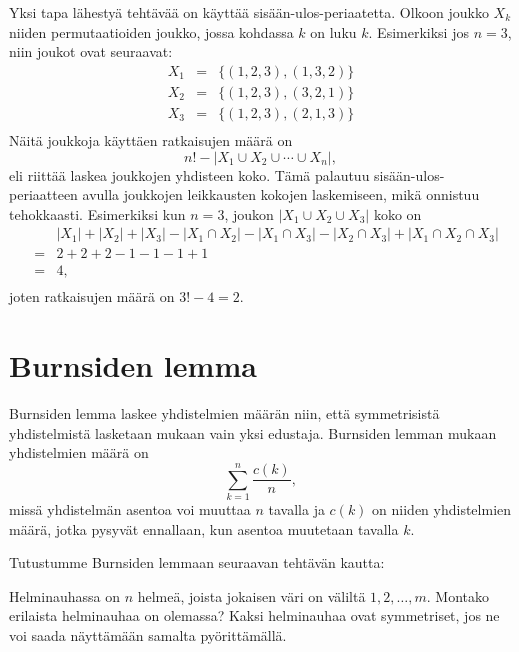 Yksi tapa lähestyä tehtävää on käyttää sisään-ulos-periaatetta.
Olkoon joukko $X_k$ niiden permutaatioiden joukko,
jossa kohdassa $k$ on luku $k$.
Esimerkiksi jos $n=3$, niin joukot ovat seuraavat:
\[
\begin{array}{lcl}
X_1 & = & \{(1,2,3),(1,3,2)\} \\
X_2 & = & \{(1,2,3),(3,2,1)\} \\
X_3 & = & \{(1,2,3),(2,1,3)\} \\
\end{array}
\]
Näitä joukkoja käyttäen ratkaisujen määrä on
\[ n! - |X_1 \cup X_2 \cup \cdots \cup X_n|, \]
eli
riittää laskea joukkojen yhdisteen koko.
Tämä palautuu sisään-ulos-peri\-aatteen avulla
joukkojen leikkausten kokojen laskemiseen,
mikä onnistuu tehokkaasti.
Esimerkiksi kun $n=3$, joukon $|X_1 \cup X_2 \cup X_3|$ koko on
\[
\begin{array}{lcl}
 & & |X_1| + |X_2| + |X_3| - |X_1 \cap X_2|  - |X_1 \cap X_3|  - |X_2 \cap X_3| + |X_1 \cap X_2 \cap X_3| \\
 & = & 2+2+2-1-1-1+1 \\
 & = & 4, \\
\end{array}
\]
joten ratkaisujen määrä on $3!-4=2$.

\section{Burnsiden lemma}

Burnsiden lemma laskee yhdistelmien määrän niin,
että symmetrisistä yhdistelmistä lasketaan
mukaan vain yksi edustaja.
Burnsiden lemman mukaan yhdistelmien määrä on
\[\sum_{k=1}^n \frac{c(k)}{n},\]
missä yhdistelmän asentoa voi muuttaa $n$ tavalla
ja $c(k)$ on niiden yhdistelmien määrä,
jotka pysyvät ennallaan, kun asentoa
muutetaan tavalla $k$.

\newpage
\noindent
Tutustumme Burnsiden lemmaan seuraavan tehtävän kautta:

\begin{task}
Helminauhassa on $n$ helmeä,
joista jokaisen väri on väliltä $1,2,\ldots,m$.
Montako erilaista helminauhaa on olemassa?
Kaksi helminauhaa ovat symmetriset,
jos ne voi saada näyttämään samalta pyörittämällä.
\end{task}

